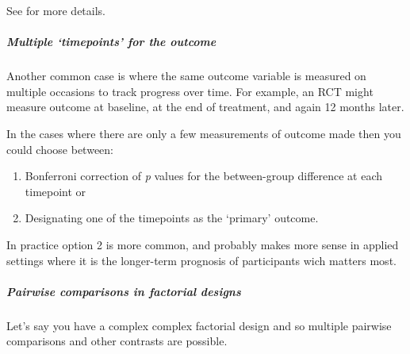 \documentclass[]{article}
\providecommand{\tightlist}{%
  \setlength{\itemsep}{0pt}\setlength{\parskip}{0pt}}
\let\oldsubparagraph\subparagraph
\renewcommand{\subparagraph}[1]{\oldsubparagraph{#1}\mbox{}}
\begin{document}
See \citet{feise2002multiple} for more details.

\hypertarget{multiple-timepoints-for-the-outcome}{%
\subparagraph{Multiple `timepoints' for the outcome}\label{multiple-timepoints-for-the-outcome}}

Another common case is where the same outcome variable is measured on multiple
occasions to track progress over time. For example, an RCT might measure outcome
at baseline, at the end of treatment, and again 12 months later.

In the cases where there are only a few measurements of outcome made then you
could choose between:

\begin{enumerate}
\def\labelenumi{\arabic{enumi}.}
\tightlist
\item
  Bonferroni correction of \emph{p} values for the between-group difference at each
  timepoint or
\item
  Designating one of the timepoints as the `primary' outcome.
\end{enumerate}

In practice option 2 is more common, and probably makes more sense in applied
settings where it is the longer-term prognosis of participants wich matters
most.

\hypertarget{pairwise-comparisons-in-factorial-designs}{%
\subparagraph{Pairwise comparisons in factorial designs}\label{pairwise-comparisons-in-factorial-designs}}

Let's say you have a complex complex factorial design and so multiple pairwise
comparisons and other contrasts are possible.
\end{document}
